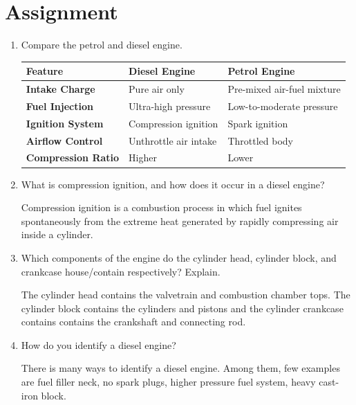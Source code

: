 \section{Assignment}

\begin{enumerate}

	\item Compare the petrol and diesel engine.

	      \begin{center}
		      \begin{tabular} {|l|l|l|}
			      \hline
			      \textbf{Feature}           & \textbf{Diesel Engine} & \textbf{Petrol Engine}     \\
			      \hline
			      \textbf{Intake Charge}     & Pure air only          & Pre-mixed air-fuel mixture \\
			      \textbf{Fuel Injection}    & Ultra-high pressure    & Low-to-moderate pressure   \\
			      \textbf{Ignition System}   & Compression ignition   & Spark ignition             \\
			      \textbf{Airflow Control}   & Unthrottle air intake  & Throttled body             \\
			      \textbf{Compression Ratio} & Higher                 & Lower                      \\
			      \hline
		      \end{tabular}
	      \end{center}

	\item What is compression ignition, and how does it occur in a diesel engine?

	      Compression ignition is a combustion process in which fuel ignites spontaneously from the extreme heat generated by rapidly compressing air inside a cylinder.

	\item Which components of the engine do the cylinder head, cylinder block, and crankcase house/contain respectively? Explain.

	      The cylinder head contains the valvetrain and combustion chamber tops. The cylinder block contains the cylinders and pistons and the cylinder crankcase contains contains the crankshaft and connecting rod.

	\item How do you identify a diesel engine?

	      There is many ways to identify a diesel engine. Among them, few examples are fuel filler neck, no spark plugs, higher pressure fuel system, heavy cast-iron block.


\end{enumerate}
